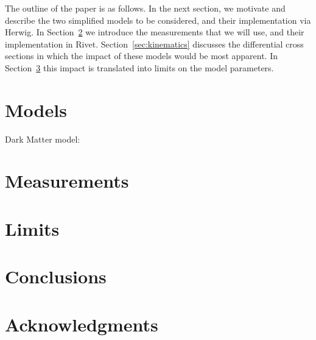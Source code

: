 \documentclass[floatfix]{article}
\begin{document}
The outline of the paper is as follows. In the next section, we motivate and describe the two 
simplified models to be considered, and their implementation via Herwig. In Section~\ref{sec:measurements}
we introduce the measurements that we will use, and their implementation in Rivet. Section~\ref{sec:kinematics}
discusses the differential cross sections in which the impact of these models would be 
most apparent. In Section~\ref{sec:limits} this impact is translated into limits on the model parameters.

\section{Models}\label{sec:models}


Dark Matter model:
\cite{Kahlhoefer:2015bea}


\section{Measurements}\label{sec:measurements}

\section{Limits}\label{sec:limits}

\section{Conclusions}\label{sec:conclusions}

\section*{Acknowledgments}





\end{document}

